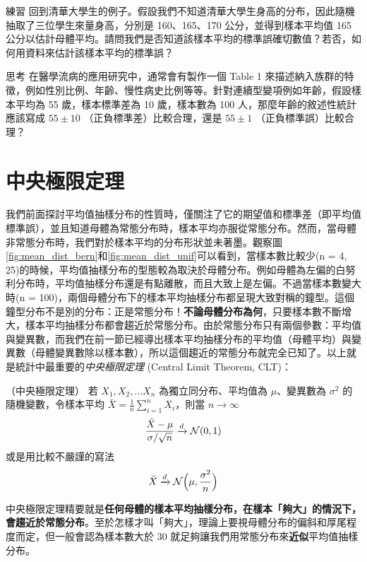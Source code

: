     \bigskip

    \begin{custom}{練習}
        回到清華大學生的例子。假設我們不知道清華大學生身高的分布，因此隨機抽取了三位學生來量身高，分別是 160、165、170 公分，並得到樣本平均值 165 公分以估計母體平均。請問我們是否知道該樣本平均的標準誤確切數值？若否，如何用資料來估計該樣本平均的標準誤？
    \end{custom}

    \bigskip

    \begin{custom}{思考}
        在醫學流病的應用研究中，通常會有製作一個 Table 1 來描述納入族群的特徵，例如性別比例、年齡、慢性病史比例等等。針對連續型變項例如年齡，假設樣本平均為 55 歲，樣本標準差為 10 歲，樣本數為 100 人，那麼年齡的敘述性統計應該寫成 $55 \pm 10$ （正負標準差）比較合理，還是 $55 \pm 1$ （正負標準誤）比較合理？
    \end{custom}
    
\section{中央極限定理}
    我們前面探討平均值抽樣分布的性質時，僅關注了它的期望值和標準差（即平均值標準誤），並且知道母體為常態分布時，樣本平均亦服從常態分布。然而，當母體非常態分布時，我們對於樣本平均的分布形狀並未著墨。觀察圖\ref{fig:mean_dist_bern}和\ref{fig:mean_dist_unif}可以看到，當樣本數比較少(n = 4, 25)的時候，平均值抽樣分布的型態較為取決於母體分布。例如母體為左偏的白努利分布時，平均值抽樣分布還是有點離散，而且大致上是左偏。不過當樣本數變大時(n = 100)，兩個母體分布下的樣本平均抽樣分布都呈現大致對稱的鐘型。這個鐘型分布不是別的分布：正是常態分布！\textbf{不論母體分布為何}，只要樣本數不斷增大，樣本平均抽樣分布都會趨近於常態分布。由於常態分布只有兩個參數：平均值與變異數，而我們在前一節已經導出樣本平均抽樣分布的平均值（母體平均）與變異數（母體變異數除以樣本數），所以這個趨近的常態分布就完全已知了。以上就是統計中最重要的\textit{中央極限定理} (Central Limit Theorem, CLT)：

    \begin{theorem*}{（中央極限定理）}
        若 $X_1, X_2, ... X_n$ 為獨立同分布、平均值為 $\mu$、變異數為 $\sigma^2$ 的隨機變數，令樣本平均 $\bar{X} = \frac{1}{n}\sum_{i=1}^n X_i$，則當 $n \rightarrow \infty$
        \[\frac{\bar{X}-\mu}{\sigma/\sqrt{n}} \xrightarrow[]{d} \mathcal{N}(0,1)\]
        或是用比較不嚴謹的寫法
        \[\bar{X} \xrightarrow[]{d} \mathcal{N}\Big(\mu,\frac{\sigma^2}{n}\Big)\]
    \end{theorem*}
    中央極限定理精要就是\textbf{任何母體的樣本平均抽樣分布，在樣本「夠大」的情況下，會趨近於常態分布}。至於怎樣才叫「夠大」，理論上要視母體分布的偏斜和厚尾程度而定，但一般會認為樣本數大於 30 就足夠讓我們用常態分布來\textbf{近似}平均值抽樣分布。
    
